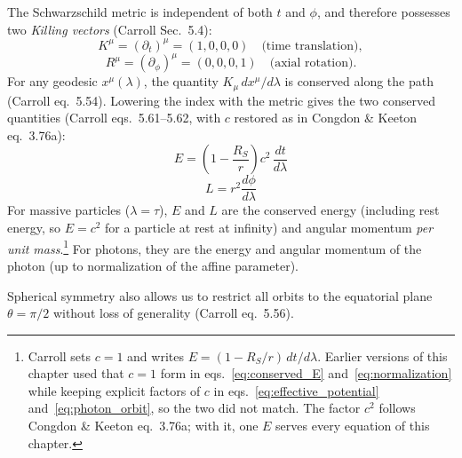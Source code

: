 The Schwarzschild metric is independent of both $t$ and $\phi$, and
therefore possesses two \emph{Killing vectors} (Carroll Sec.~5.4):
\begin{equation}
    K^\mu = (\partial_t)^\mu = (1, 0, 0, 0) \quad \text{(time translation)},
    \label{eq:killing_t}
\end{equation}
\begin{equation}
    R^\mu = (\partial_\phi)^\mu = (0, 0, 0, 1) \quad \text{(axial rotation)}.
    \label{eq:killing_phi}
\end{equation}
For any geodesic $x^\mu(\lambda)$, the quantity $K_\mu\, dx^\mu/d\lambda$
is conserved along the path (Carroll eq.~5.54).  Lowering the index with
the metric gives the two conserved quantities (Carroll eqs.~5.61--5.62,
with $c$ restored as in Congdon \& Keeton eq.~3.76a):
\begin{equation}
    \boxed{
    E = \left(1 - \frac{R_S}{r}\right) c^2\,\frac{dt}{d\lambda}
    }
    \label{eq:conserved_E}
\end{equation}
\begin{equation}
    \boxed{
    L = r^2 \frac{d\phi}{d\lambda}
    }
    \label{eq:conserved_L}
\end{equation}
For massive particles ($\lambda = \tau$), $E$ and $L$ are the conserved
energy (including rest energy, so $E = c^2$ for a particle at rest at
infinity) and angular momentum \emph{per unit mass}.\footnote{Carroll
sets $c = 1$ and writes $E = (1 - R_S/r)\,dt/d\lambda$.  Earlier versions
of this chapter used that $c = 1$ form in eqs.~\eqref{eq:conserved_E}
and~\eqref{eq:normalization} while keeping explicit factors of $c$ in
eqs.~\eqref{eq:effective_potential} and~\eqref{eq:photon_orbit}, so the
two did not match.  The factor $c^2$ follows Congdon \& Keeton
eq.~3.76a; with it, one $E$ serves every equation of this chapter.}  For photons, they are
the energy and angular momentum of the photon (up to normalization of the
affine parameter).

Spherical symmetry also allows us to restrict all orbits to the
equatorial plane $\theta = \pi/2$ without loss of generality (Carroll
eq.~5.56).

